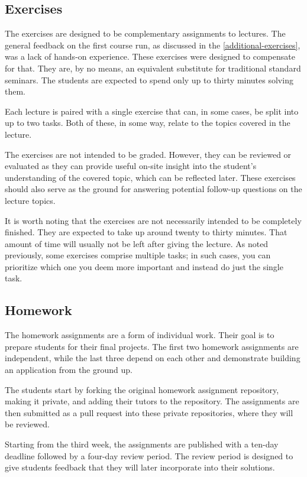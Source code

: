 \documentclass[
  digital,
  color,
  oneside,
  nosansbold,
  nocolorbold,
  lof,
  nolot,
]{fithesis4}
\begin{document}
\subsection{Exercises}\label{exercises}

The exercises are designed to be complementary assignments to lectures. The general feedback on the first course run, as discussed in the \cref{additional-exercises}, was a lack of hands-on experience. These exercises were designed to compensate for that. They are, by no means, an equivalent substitute for traditional standard seminars. The students are expected to spend only up to thirty minutes solving them.

Each lecture is paired with a single exercise that can, in some cases, be split into up to two tasks. Both of these, in some way, relate to the topics covered in the lecture.

The exercises are not intended to be graded. However, they can be reviewed or evaluated as they can provide useful on-site insight into the student's understanding of the covered topic, which can be reflected later. These exercises should also serve as the ground for answering potential follow-up questions on the lecture topics.

It is worth noting that the exercises are not necessarily intended to be completely finished. They are expected to take up around twenty to thirty minutes. That amount of time will usually not be left after giving the lecture. As noted previously, some exercises comprise multiple tasks; in such cases, you can prioritize which one you deem more important and instead do just the single task.

\subsection{Homework}

The homework assignments are a form of individual work. Their goal is to prepare students for their final projects. The first two homework assignments are independent, while the last three depend on each other and demonstrate building an application from the ground up.

The students start by forking the original homework assignment repository, making it private, and adding their tutors to the repository. The assignments are then submitted as a pull request into these private repositories, where they will be reviewed.

Starting from the third week, the assignments are published with a ten-day deadline followed by a four-day review period. The review period is designed to give students feedback that they will later incorporate into their solutions.
\end{document}
